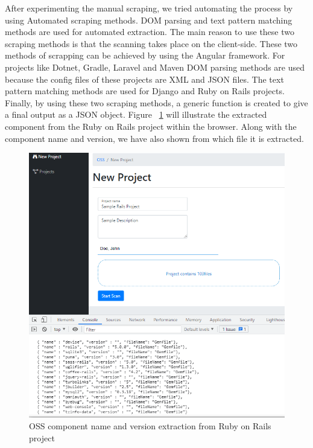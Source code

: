 After experimenting the manual scraping, we tried automating the process by using Automated scraping methods. \acs{DOM} parsing and text pattern matching methods are used for automated extraction. The main reason to use these two scraping methods is that the scanning takes place on the client-side. These two methods of scrapping can be achieved by using the Angular framework. For projects like Dotnet, Gradle, Laravel and Maven \acs{DOM} parsing methods are used because the config files of these projects are \acs{XML} and \acs{JSON} files. The text pattern matching methods are used for Django and Ruby on Rails projects. Finally, by using these two scraping methods, a generic function is created to give a final output as a \acs{JSON} object. Figure ~\ref{fig:clientOutput} will illustrate the extracted component from the Ruby on Rails project within the browser. Along with the component name and version, we have also shown from which file it is extracted. 
\newpage
\begin{figure}[H]
	\includegraphics[width=15cm]{includes/clientOutput.PNG}
	\centering
	\caption{\acs{OSS} component name and version extraction from Ruby on Rails project}
	\label{fig:clientOutput}
\end{figure}

